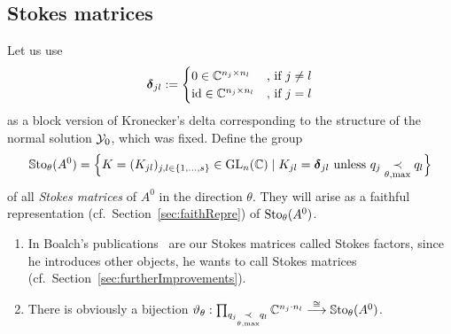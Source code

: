 \subsection{Stokes matrices}\label{sec:matrixReps}
\begin{defn}\label{defn:groupOfFaithfullReps}
  Let us use
  \[
    \boldsymbol{\delta}_{jl}:=
    \begin{cases}
      0 \in \mathbb{C}^{n_j\times n_l} & \text{,~if~} j\neq l
    \\\operatorname{id} \in \mathbb{C}^{n_j\times n_l} & \text{,~if~} j=l
    \end{cases}
  \]
  as a block version of Kronecker's delta corresponding to the structure of the
  normal solution $\mathcal{Y}_0$, which was fixed.
  Define the group
  \begin{align*}
    \operatorname{\mathbb{S}to}_\theta(A^0)= \Big\{K=(K_{jl})_{j,l\in\{1,\dots,s\}}\in\operatorname{GL}_n(\mathbb{C}) \mid
      K_{jl}=\boldsymbol{\delta}_{jl} \text{~unless~}
      q_j \underset{\theta,\max}{\prec} q_l \Big\}
  \end{align*}
  of all \emph{Stokes matrices} of $A^0$ in the direction $\theta$.
  They will arise as a faithful representation
  (cf.\ Section~\ref{sec:faithRepre}) of $\operatorname{Sto}_\theta(A^0)$.
  \begin{s-rem}
    \begin{enumerate}
      \item In Boalch's publications~\cite{boalch,thboalch} are our Stokes
        matrices called Stokes factors, since he introduces other objects, he
        wants to call Stokes matrices
        (cf.\ Section~\ref{sec:furtherImprovements}).
      \item There is obviously a bijection
        $\vartheta_\theta:
        \prod_{q_j\underset{\theta,\max}{\prec}q_l}\mathbb{C}^{n_j \cdot n_l}
        \overset{\cong}{\longrightarrow} \operatorname{\mathbb{S}to}_\theta(A^0)$.
    \end{enumerate}
  \end{s-rem}
\iffalse

\end{defn}
